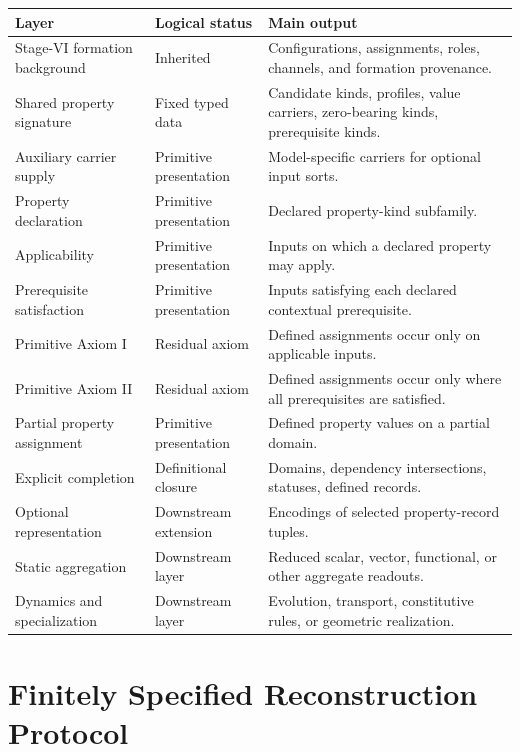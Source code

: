 \documentclass[11pt]{article}
\theoremstyle{definition}
\theoremstyle{remark}
\begin{document}
\begin{tabularx}{\textwidth}{@{}>{\raggedright\arraybackslash}p{}>{\raggedright\arraybackslash}p{}X@{}}
\toprule
Layer & Logical status & Main output\\
\midrule
Stage-VI formation background & Inherited & Configurations, assignments, roles, channels, and formation provenance.\\
Shared property signature & Fixed typed data & Candidate kinds, profiles, value carriers, zero-bearing kinds, prerequisite kinds.\\
Auxiliary carrier supply & Primitive presentation & Model-specific carriers for optional input sorts.\\
Property declaration & Primitive presentation & Declared property-kind subfamily.\\
Applicability & Primitive presentation & Inputs on which a declared property may apply.\\
Prerequisite satisfaction & Primitive presentation & Inputs satisfying each declared contextual prerequisite.\\
Primitive Axiom I & Residual axiom & Defined assignments occur only on applicable inputs.\\
Primitive Axiom II & Residual axiom & Defined assignments occur only where all prerequisites are satisfied.\\
Partial property assignment & Primitive presentation & Defined property values on a partial domain.\\
Explicit completion & Definitional closure & Domains, dependency intersections, statuses, defined records.\\
Optional representation & Downstream extension & Encodings of selected property-record tuples.\\
Static aggregation & Downstream layer & Reduced scalar, vector, functional, or other aggregate readouts.\\
Dynamics and specialization & Downstream layer & Evolution, transport, constitutive rules, or geometric realization.\\
\bottomrule
\end{tabularx}

\section{Finitely Specified Reconstruction Protocol}
\label{app:finite-protocol}
\end{document}
